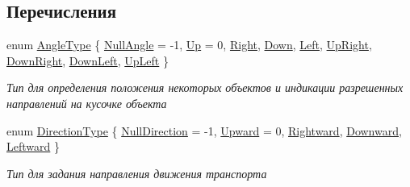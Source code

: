 \subsection*{Перечисления}
\begin{DoxyCompactItemize}
\item 
enum \hyperlink{namespacertm_a69dc82b16a0148c10962caa83d930f89}{Angle\+Type} \{ \newline
\hyperlink{namespacertm_a69dc82b16a0148c10962caa83d930f89a4c9d89d07c6a731bb94e24961d96dc8a}{Null\+Angle} = -\/1, 
\hyperlink{namespacertm_a69dc82b16a0148c10962caa83d930f89a71f9d728ef9acc426b82f976369b54ef}{Up} = 0, 
\hyperlink{namespacertm_a69dc82b16a0148c10962caa83d930f89ac8d48eaf247eaed3ab5acb14be273d8b}{Right}, 
\hyperlink{namespacertm_a69dc82b16a0148c10962caa83d930f89aa28006ebfdd318c956a42e94ac44864c}{Down}, 
\newline
\hyperlink{namespacertm_a69dc82b16a0148c10962caa83d930f89a1ad0ee38324cf04e20cfbb075c40ab7c}{Left}, 
\hyperlink{namespacertm_a69dc82b16a0148c10962caa83d930f89a6f7178e79932d2d3ec9c804a91dc7df9}{Up\+Right}, 
\hyperlink{namespacertm_a69dc82b16a0148c10962caa83d930f89a847a323475036ccc5a6b1f6d22efe258}{Down\+Right}, 
\hyperlink{namespacertm_a69dc82b16a0148c10962caa83d930f89ae2a6b2c371919b52750ac2f860bd193c}{Down\+Left}, 
\newline
\hyperlink{namespacertm_a69dc82b16a0148c10962caa83d930f89a77042a35db6a2e7c4d19c77ad81e77c3}{Up\+Left}
 \}\begin{DoxyCompactList}\small\item\em Тип для определения положения некоторых объектов и индикации разрешенных направлений на кусочке объекта \end{DoxyCompactList}
\item 
enum \hyperlink{namespacertm_a57b216f3aeb45041f3461bab08bc3aeb}{Direction\+Type} \{ \newline
\hyperlink{namespacertm_a57b216f3aeb45041f3461bab08bc3aeba11d25fe9dbdfb448f588c5e547ca0e60}{Null\+Direction} = -\/1, 
\hyperlink{namespacertm_a57b216f3aeb45041f3461bab08bc3aebae8620d33b874d653370594b4593deebe}{Upward} = 0, 
\hyperlink{namespacertm_a57b216f3aeb45041f3461bab08bc3aebab05476a78be2c098fee8bd6defea9a58}{Rightward}, 
\hyperlink{namespacertm_a57b216f3aeb45041f3461bab08bc3aeba6a4113106dcde01bab3ba06b5dce2dcd}{Downward}, 
\newline
\hyperlink{namespacertm_a57b216f3aeb45041f3461bab08bc3aeba5d89155822daa42b76f9c06b1b9c94bb}{Leftward}
 \}\begin{DoxyCompactList}\small\item\em Тип для задания направления движения транспорта \end{DoxyCompactList}

\end{DoxyCompactItemize}
